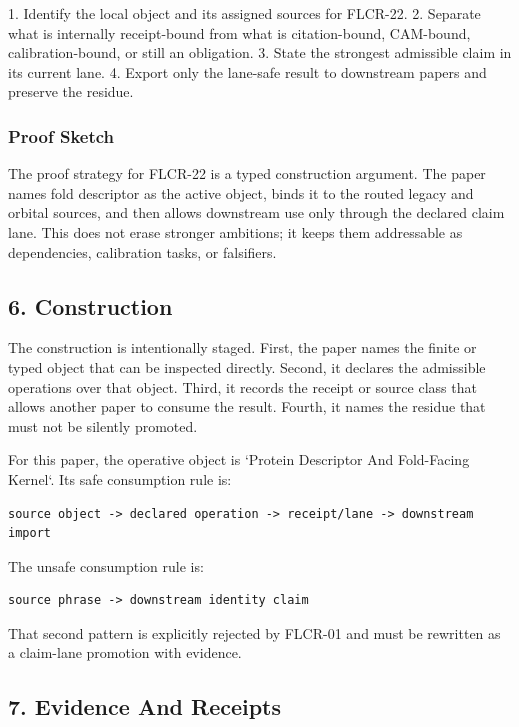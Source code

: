 \documentclass[11pt]{article}
\begin{document}
1. Identify the local object and its assigned sources for FLCR-22.
2. Separate what is internally receipt-bound from what is citation-bound, CAM-bound, calibration-bound, or still an obligation.
3. State the strongest admissible claim in its current lane.
4. Export only the lane-safe result to downstream papers and preserve the residue.

\subsubsection*{Proof Sketch}

The proof strategy for FLCR-22 is a typed construction argument. The paper names fold descriptor as the active object, binds it to the routed legacy and orbital sources, and then allows downstream use only through the declared claim lane. This does not erase stronger ambitions; it keeps them addressable as dependencies, calibration tasks, or falsifiers.

\subsection*{6. Construction}

The construction is intentionally staged. First, the paper names the finite or
typed object that can be inspected directly. Second, it declares the admissible
operations over that object. Third, it records the receipt or source class that
allows another paper to consume the result. Fourth, it names the residue that
must not be silently promoted.

For this paper, the operative object is `Protein Descriptor And Fold-Facing Kernel`. Its safe consumption
rule is:

\begin{verbatim}
source object -> declared operation -> receipt/lane -> downstream import
\end{verbatim}

The unsafe consumption rule is:

\begin{verbatim}
source phrase -> downstream identity claim
\end{verbatim}

That second pattern is explicitly rejected by FLCR-01 and must be rewritten as
a claim-lane promotion with evidence.

\subsection*{7. Evidence And Receipts}
\end{document}
